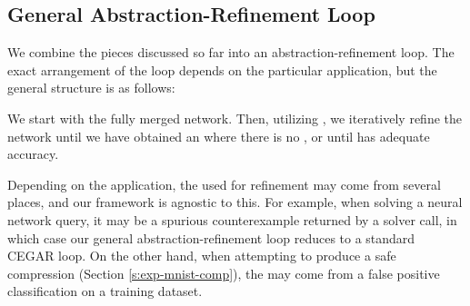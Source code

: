 \subsection{General Abstraction-Refinement Loop}
\label{s:abs-ref-fw}

We combine the pieces discussed so far into an abstraction-refinement loop. The
exact arrangement of the loop depends on the particular application, but the
general structure is as follows:

We start with the fully merged network. Then, utilizing \gencex, we iteratively
refine the network until we have obtained an \abs where there is no \gencex, or
until \abs has adequate accuracy.

Depending on the application, the \gencex used for refinement may come from
several places, and our framework is agnostic to this. For example, when solving
a neural network query, it may be a spurious counterexample returned by a solver
call, in which case our general abstraction-refinement loop reduces to a
standard CEGAR loop. On the other hand, when attempting to produce a safe
compression (Section \ref{s:exp-mnist-comp}), the \gencex may come from a false
positive classification on a training dataset.

